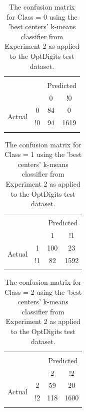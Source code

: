 \documentclass[12pt]{article}
\begin{document}
\begin{table} \centering 
  \caption{The confusion matrix for Class = 0 using the 'best centers' k-means classifier from Experiment 2 as applied to the OptDigits test dataset.} 
  \label{tab:b3} 
\begin{tabular}{lccc} 
\\[-1.8ex]\hline 
\hline \\[-1.8ex] 
\multicolumn{2}{c}{} & \multicolumn{2}{c}{Predicted} \\
\multicolumn{2}{c}{} & 0 & !0\\
\multirow{2}{*}{Actual} & 0 & 84 & 0\\
& !0 & 94 & 1619\\
\hline \\[-1.8ex]
\end{tabular} 
\end{table}

\begin{table} \centering 
  \caption{The confusion matrix for Class = 1 using the 'best centers' k-means classifier from Experiment 2 as applied to the OptDigits test dataset.} 
  \label{tab:b4} 
\begin{tabular}{lccc} 
\\[-1.8ex]\hline 
\hline \\[-1.8ex] 
\multicolumn{2}{c}{} & \multicolumn{2}{c}{Predicted} \\
\multicolumn{2}{c}{} & 1 & !1\\
\multirow{2}{*}{Actual} & 1 & 100 & 23\\
& !1 & 82 & 1592\\
\hline \\[-1.8ex]
\end{tabular} 
\end{table}

\begin{table} \centering 
  \caption{The confusion matrix for Class = 2 using the 'best centers' k-means classifier from Experiment 2 as applied to the OptDigits test dataset.} 
  \label{tab:b5} 
\begin{tabular}{lccc} 
\\[-1.8ex]\hline 
\hline \\[-1.8ex] 
\multicolumn{2}{c}{} & \multicolumn{2}{c}{Predicted} \\
\multicolumn{2}{c}{} & 2 & !2\\
\multirow{2}{*}{Actual} & 2 & 59 & 20\\
& !2 & 118 & 1600\\
\hline \\[-1.8ex]
\end{tabular} 
\end{table}
\end{document}
